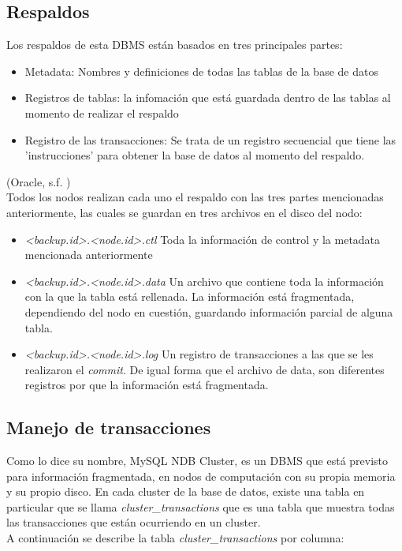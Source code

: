 \documentclass{acmart}
\begin{document}
\subsection{Respaldos}
Los respaldos de esta DBMS están basados en tres principales partes:
\begin{itemize}
    \item Metadata: Nombres y definiciones de todas las tablas de la base de datos
    \item Registros de tablas: la infomación que está guardada dentro de las tablas al momento de realizar el respaldo
    \item Registro de las transacciones: Se trata de un registro secuencial que tiene las 'instrucciones' para obtener la base de datos al momento del respaldo.
\end{itemize}
(Oracle, s.f. \cite{mysqlbackups})\\
Todos los nodos realizan cada uno el respaldo con las tres partes mencionadas anteriormente, las cuales se guardan en tres archivos en el disco del nodo:
\begin{itemize}
    \item \textit{<backup.id>.<node.id>.ctl} Toda la información de control y la metadata mencionada anteriormente
    \item \textit{<backup.id>.<node.id>.data} Un archivo que contiene toda la información con la que la tabla está rellenada. La información está fragmentada, dependiendo del nodo en cuestión, guardando información parcial de alguna tabla.
    \item \textit{<backup.id>.<node.id>.log} Un registro de transacciones a las que se les realizaron el \textit{commit}. De igual forma que el archivo de data, son diferentes registros por que la información está fragmentada.
\end{itemize}
\subsection{Manejo de transacciones}
Como lo dice su nombre, MySQL NDB Cluster, es un DBMS que está previsto para información fragmentada, en nodos de computación con su propia memoria y su propio disco.
En cada cluster de la base de datos, existe una tabla en particular que se llama \textit{cluster\_transactions} que es una tabla que muestra todas las transacciones que están ocurriendo en un cluster.\\
A continuación se describe la tabla \textit{cluster\_transactions} por columna:
\end{document}
